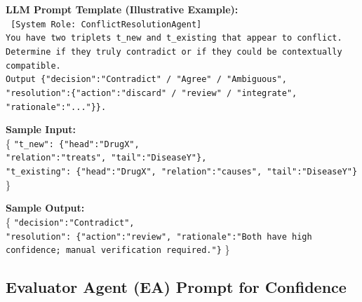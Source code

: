 \documentclass{article}
\begin{document}
\begin{tcolorbox}[colframe=black!25, colback=black!5, boxrule=0.5pt, arc=2pt]
\vspace{1mm}
\noindent
\textbf{LLM Prompt Template (Illustrative Example):}\\
\texttt{
[System Role: ConflictResolutionAgent]\\
You have two triplets t\_new and t\_existing that appear to conflict. Determine if they truly contradict or if they could be contextually compatible.\\
Output \{"decision":"Contradict" / "Agree" 
/ "Ambiguous",\\ "resolution":\{"action":"discard" / "review" / 
"integrate",\\ "rationale":"..."\}\}.
}

\vspace{1mm}
\noindent
\textbf{Sample Input:}\\
\{
  \texttt{"t\_new": \{"head":"DrugX",\\
  "relation":"treats", "tail":"DiseaseY"\},}\\
  \texttt{"t\_existing": \{"head":"DrugX", "relation":"causes", "tail":"DiseaseY"\}}
\}

\vspace{1mm}
\noindent
\textbf{Sample Output:}\\
\{
  \texttt{"decision":"Contradict",}\\
  \texttt{"resolution": \{"action":"review", "rationale":"Both have high confidence; manual verification required."\}}
\}
\end{tcolorbox}
\newpage

\subsection{Evaluator Agent (EA) Prompt for Confidence}
\label{appendix:ea_prompt_confidence}
\end{document}
